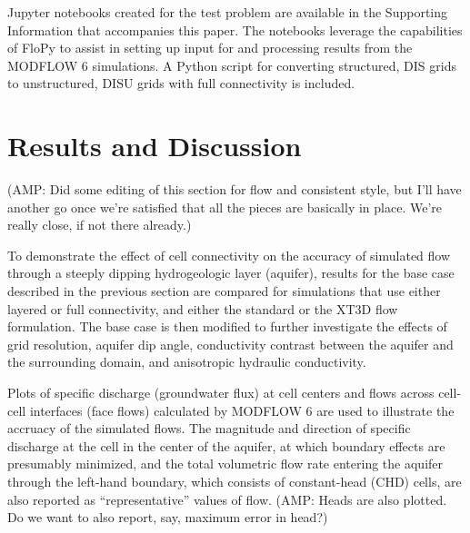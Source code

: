 \documentclass{article}
\begin{document}
Jupyter notebooks created for the test problem are available in the Supporting Information that accompanies this paper. The notebooks leverage the capabilities of FloPy \citep{bakker2016scripting, hughes2023flopy} to assist in setting up input for and processing results from the MODFLOW 6 simulations. A Python script for converting structured, DIS grids to unstructured, DISU grids with full connectivity is included.

\section{Results and Discussion}

{\color{red} (AMP: Did some editing of this section for flow and consistent style, but I'll have another go once we're satisfied that all the pieces are basically in place. We're really close, if not there already.)}

To demonstrate the effect of cell connectivity on the accuracy of simulated flow through a steeply dipping hydrogeologic layer (aquifer), results for the base case described in the previous section are compared for simulations that use either layered or full connectivity, and either the standard or the XT3D flow formulation. The base case is then modified to further investigate the effects of grid resolution, aquifer dip angle, conductivity contrast between the aquifer and the surrounding domain, and anisotropic hydraulic conductivity.

Plots of specific discharge (groundwater flux) at cell centers and flows across cell-cell interfaces (face flows) calculated by MODFLOW 6 are used to illustrate the accruacy of the simulated flows. The magnitude and direction of specific discharge at the cell in the center of the aquifer, at which boundary effects are presumably minimized, and the total volumetric flow rate entering the aquifer through the left-hand boundary, which consists of constant-head (CHD) cells, are also reported as ``representative'' values of flow. {\color{red} (AMP: Heads are also plotted. Do we want to also report, say, maximum error in head?)}
\end{document}
